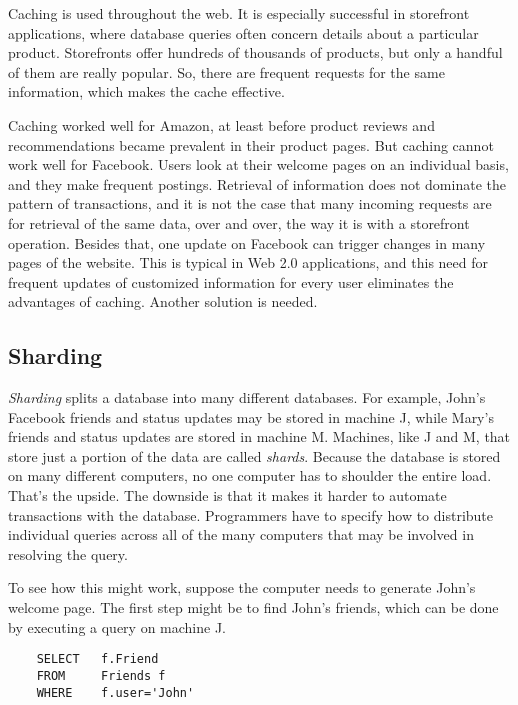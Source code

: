 Caching is used throughout the web.
It is especially successful in storefront applications,
where database queries often concern details about a particular product.
Storefronts offer hundreds of thousands of products,
but only a handful of them are really popular.
So, there are frequent requests for the same information,
which makes the cache effective.

Caching worked well for Amazon, at least before product reviews
and recommendations became prevalent in their product pages.
But caching cannot work well for Facebook.
Users look at their welcome pages on an individual basis,
and they make frequent postings. Retrieval of information
does not dominate the pattern of transactions,
and it is not the case that many incoming requests
are for retrieval of the same data, over and over,
the way it is with a storefront operation.
Besides that, one update on Facebook can trigger changes in many pages of the website.
This is typical in Web 2.0 applications,
and this need for frequent updates of customized information
for every user eliminates the advantages of caching.
Another solution is needed.

\subsection{Sharding}

\emph{Sharding} splits a database into many different databases.
For example, John's Facebook friends and status updates may be stored in machine J, while
Mary's friends and status updates are stored in machine M.
Machines, like J and M, that store just a portion of the data are called \emph{shards}.
Because the database is stored on many different computers,
no one computer has to shoulder the entire load.
That's the upside.
The downside is that it makes it harder
to automate transactions with the database.
Programmers have to specify how to distribute
individual queries across all of the many computers
that may be involved in resolving the query.

To see how this might work,
suppose the computer needs to generate John's welcome page.
The first step might be to find John's friends,
which can be done by executing a query on machine J.
\begin{code}
\begin{verbatim}
	SELECT   f.Friend
	FROM     Friends f
	WHERE    f.user='John'
\end{verbatim}
\end{code}

